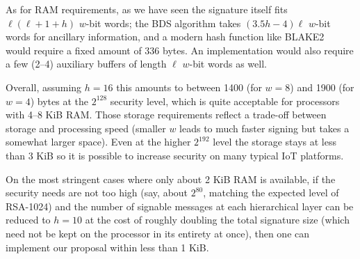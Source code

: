 \documentclass[11pt]{llncs}
\begin{document}
As for RAM requirements, as we have seen the signature itself fits $\ell(\ell + 1 + h)$ $w$-bit words; the BDS algorithm takes $(3.5h - 4)\ell$ $w$-bit words for ancillary information, and a modern hash function like BLAKE2~\cite{aumasson-neves-wilcoxohearn-winnerlein} would require a fixed amount of 336 bytes. An implementation would also require a few (2--4) auxiliary buffers of length $\ell$ $w$-bit words as well. 
\begin{comment}
w := 4; h := 16; aux := 4; l := 152/w; ((3/2)*h - 4)*l*(w/8) + l*(l + 1 + h)*(w/8) + aux*l*(w/8) + 336; // sec 2^125
w := 8; h := 16; aux := 4; l := 144/w; ((3/2)*h - 4)*l*(w/8) + l*(l + 1 + h)*(w/8) + aux*l*(w/8) + 336; // sec 2^128
w := 4; h := 16; aux := 4; l := 216/w; ((3/2)*h - 4)*l*(w/8) + l*(l + 1 + h)*(w/8) + aux*l*(w/8) + 336; // sec 2^196
w := 8; h := 16; aux := 4; l := 216/w; ((3/2)*h - 4)*l*(w/8) + l*(l + 1 + h)*(w/8) + aux*l*(w/8) + 336; // sec 2^192
w := 4; h := 16; aux := 4; l := 120/w; ((3/2)*h - 4)*l*(w/8) + l*(l + 1 + h)*(w/8) + aux*l*(w/8) + 336; // sec 2^101
w := 8; h := 16; aux := 4; l := 120/w; ((3/2)*h - 4)*l*(w/8) + l*(l + 1 + h)*(w/8) + aux*l*(w/8) + 336; // sec 2^97

w := 4; h := 10; aux := 4; l := 104/w; ((3/2)*h - 4)*l*(w/8) + l*(l + 1 + h)*(w/8) + aux*l*(w/8) + 336; // sec 2^86
w := 8; h := 10; aux := 4; l := 104/w; ((3/2)*h - 4)*l*(w/8) + l*(l + 1 + h)*(w/8) + aux*l*(w/8) + 336; // sec 2^82
\end{comment}

Overall, assuming $h = 16$ this amounts to between 1400 (for $w = 8$) and 1900 (for $w = 4$) bytes at the $2^{128}$ security level, which is quite acceptable for processors with 4--8 KiB RAM. Those storage requirements reflect a trade-off between storage and processing speed (smaller $w$ leads to much faster signing but takes a somewhat larger space). Even at the higher $2^{192}$ level the storage stays at less than 3 KiB so it is possible to increase security on many typical IoT platforms.

On the most stringent cases where only about 2 KiB RAM is available, if the security needs are not too high (say, about $2^{80}$, matching the expected level of RSA-1024) and the number of signable messages at each hierarchical layer can be reduced to $h = 10$ at the cost of roughly doubling the total signature size (which need not be kept on the processor in its entirety at once), then one can implement our proposal within less than 1 KiB.

\end{document}

